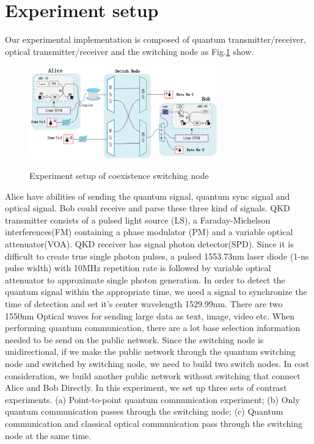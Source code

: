 \documentclass[letterpaper,10pt]{article}
\begin{document}
\section{Experiment setup}
Our experimental implementation is composed of quantum transmitter/receiver, optical transmitter/receiver and the switching node as Fig.\ref{Fig:experiment_of_switching_node} show.
\begin{figure}
 \centering
 \includegraphics[height= 4cm,width=.6\linewidth]{experiment_of_switching_node}
 \label{Fig:experiment_of_switching_node}
 \caption{Experiment setup of coexistence switching node}
\end{figure}
Alice have abilities of sending the quantum signal, quantum sync signal and optical signal. Bob could receive and parse these three kind of signals. QKD transmitter consists of a pulsed light source (LS), a Faraday-Michelson interferences(FM) containing a phase modulator (PM) and a variable optical attenuator(VOA). QKD receiver has signal photon detector(SPD). Since it is difficult to create true single photon pulses, a pulsed 1553.73nm laser diode (1-ns pulse width) with 10MHz repetition rate is followed by variable optical attenuator to approximate single photon generation. In order to detect the quantum signal within the appropriate time, we need a signal to synchronize the time of detection and set it's center wavelength 1529.99nm. There are two 1550nm Optical waves for sending large data as text, image, video etc. When performing quantum communication, there are a lot base selection information needed to be send on the public network. Since the switching node is unidirectional, if we make the public network through the quantum switching node and switched by switching node, we need to build two switch nodes. In cost consideration, we build another public network without switching  that connect Alice and Bob Directly. In this experiment, we set up three sets of contrast experiments. (a) Point-to-point quantum communication experiment; (b) Only quantum communication passes through the switching node; (c) Quantum communication and classical optical communication pass through the switching node at the same time.
\end{document}
